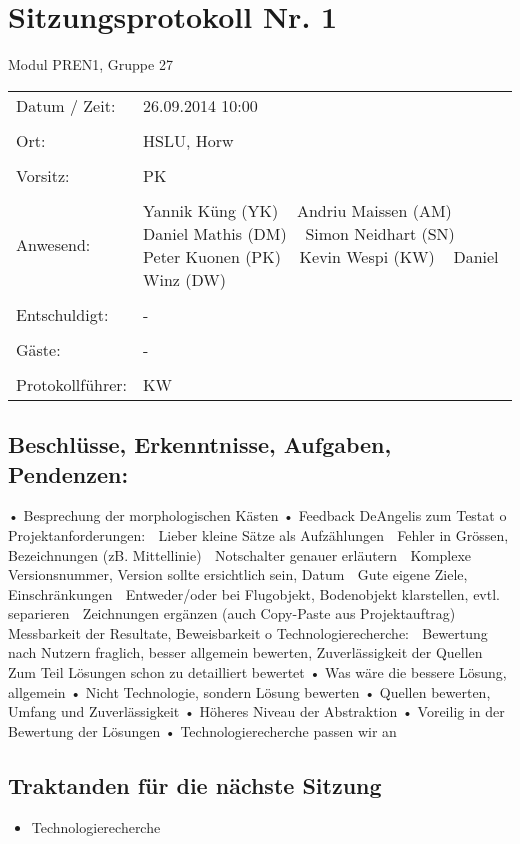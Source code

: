 \documentclass[a4paper,10pt,fleqn]{article}
\begin{document}
\section*{Sitzungsprotokoll Nr. 1}
Modul PREN1, Gruppe 27

\begin{longtable}[l]{@{}p{}@{}p{}@{}}
    Datum / Zeit: &
        26.09.2014 10:00
        \\\\
    Ort: &
        HSLU, Horw
        \\\\
    Vorsitz: &
        PK
        \\\\
    Anwesend: &
        Yannik Küng (YK) ~
        Andriu Maissen (AM) ~
        Daniel Mathis (DM) ~
        Simon Neidhart (SN) ~
        Peter Kuonen (PK) ~
        Kevin Wespi (KW) ~
        Daniel Winz (DW) ~
        \\\\
    Entschuldigt: &
        - ~
        \\\\
    Gäste: &
        - ~
        \\\\
    Protokollführer: &
        KW
        \\
\end{longtable}
%
\subsection*{Beschlüsse, Erkenntnisse, Aufgaben, Pendenzen:}
\begin{itemize}
•	Besprechung der morphologischen Kästen
•	Feedback DeAngelis zum Testat
o	Projektanforderungen:
	Lieber kleine Sätze als Aufzählungen
	Fehler in Grössen, Bezeichnungen (zB. Mittellinie)
	Notschalter genauer erläutern
	Komplexe Versionsnummer, Version sollte ersichtlich sein, Datum
	Gute eigene Ziele, Einschränkungen
	Entweder/oder bei Flugobjekt, Bodenobjekt klarstellen, evtl. separieren
	Zeichnungen ergänzen (auch Copy-Paste aus Projektauftrag)
	Messbarkeit der Resultate, Beweisbarkeit
o	Technologierecherche:
	Bewertung nach Nutzern fraglich, besser allgemein bewerten, Zuverlässigkeit der Quellen
	Zum Teil Lösungen schon zu detailliert bewertet
•	Was wäre die bessere Lösung, allgemein
•	Nicht Technologie, sondern Lösung bewerten
•	Quellen bewerten, Umfang und Zuverlässigkeit
•	Höheres Niveau der Abstraktion
•	Voreilig in der Bewertung der Lösungen
•	Technologierecherche passen wir an

\end{itemize}
%
\subsection*{Traktanden für die nächste Sitzung}
\begin{itemize}
    \item Technologierecherche
    
\end{itemize}
%
\end{document}
